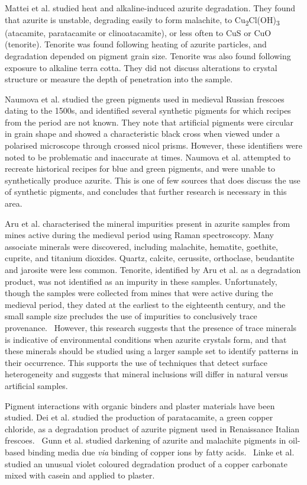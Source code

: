 Mattei et al. studied heat and alkaline-induced azurite degradation. They found that azurite is unstable, degrading easily to form malachite, to Cu\textsubscript{2}Cl(OH)\textsubscript{3} (atacamite, paratacamite or clinoatacamite), or less often to CuS or CuO (tenorite). Tenorite was found following heating of azurite particles, and degradation depended on pigment grain size. Tenorite was also found following exposure to alkaline terra cotta. They did not discuss alterations to crystal structure or measure the depth of penetration into the sample.~\autocite{Mattei} 

Naumova et al. studied the green pigments used in medieval Russian frescoes dating to the 1500s, and identified several synthetic pigments for which recipes from the period are not known. They note that artificial pigments were circular in grain shape and showed a characteristic black cross when viewed under a polarised microscope through crossed nicol prisms. However, these identifiers were noted to be problematic and inaccurate at times. Naumova et al. attempted to recreate historical recipes for blue and green pigments, and were unable to synthetically produce azurite. This is one of few sources that does discuss the use of synthetic pigments, and concludes that further research is necessary in this area.~\autocite{Naumova1994,Naumova1990}

Aru et al. characterised the mineral impurities present in azurite samples from mines active during the medieval period using Raman spectroscopy. Many associate minerals were discovered, including malachite, hematite, goethite, cuprite, and titanium dioxides. Quartz, calcite, cerussite, orthoclase, beudantite and jarosite were less common. Tenorite, identified by Aru et al. as a degradation product, was not identified as an impurity in these samples. Unfortunately, though the samples were collected from mines that were active during the medieval period, they dated at the earliest to the eighteenth century, and the small sample size precludes the use of impurities to conclusively trace provenance.~\autocite{Aru} However, this research suggests that the presence of trace minerals is indicative of environmental conditions when azurite crystals form, and that these minerals should be studied using a larger sample set to identify patterns in their occurrence. This supports the use of techniques that detect surface heterogeneity and suggests that mineral inclusions will differ in natural versus artificial samples.

Pigment interactions with organic binders and plaster materials have been studied. Dei et al. studied the production of paratacamite, a green copper chloride, as a degradation product of azurite pigment used in Renaissance Italian frescoes.~\autocite{Dei} Gunn et al. studied darkening of azurite and malachite pigments in oil-based binding media due \textit{via} binding of copper ions by fatty acids.~\autocite{Gunn} Linke et al. studied an unusual violet coloured degradation product of a copper carbonate mixed with casein and applied to plaster.~\autocite{Linke}


